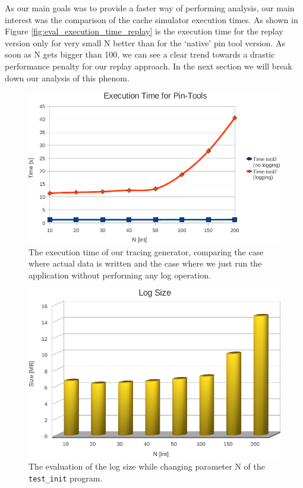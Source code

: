 As our main goals was to provide a faster way of performing analysis,
our main interest was the comparison of the cache simulator execution
times. As shown in Figure \ref{fig:eval_execution_time_replay} is the
execution time for the replay version only for very small N better
than for the `native' pin tool version. As soon as N gets bigger than
100, we can see a clear trend towards a drastic performance penalty
for our replay approach. In the next section we will break down our
analysis of this phenom.

\begin{figure}
  \includegraphics[width=\columnwidth]{eval_execution_time_tracing}
  \caption{The execution time of our tracing generator, comparing the
    case where actual data is written and the case where we just run
    the application without performing any log operation.}
  \label{fig:eval_execution_time_tracing}
\end{figure}

\begin{figure}
  \includegraphics[width=\columnwidth]{eval_log_size}
  \caption{The evaluation of the log size while changing parameter N of the \texttt{test\_init} program. }
  \label{fig:eval_log_size}
\end{figure}


